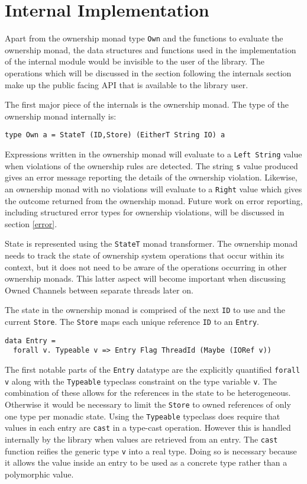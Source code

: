 \documentclass[onehalf,11pt]{beavtex}
\begin{document}
\section{Internal Implementation}

Apart from the ownership monad type \texttt{Own} and the functions to evaluate
the ownership monad, the data structures and functions used in the
implementation of the internal module would be invisible to the user of the
library.
The operations which will be discussed in the section following the internals
section make up the public facing API that is available to the library user.

The first major piece of the internals is the ownership monad.
The type of the ownership monad internally is:

\begin{verbatim}
type Own a = StateT (ID,Store) (EitherT String IO) a
\end{verbatim}

Expressions written in the ownership monad will evaluate to a
\texttt{Left String} value when violations of the ownership rules are detected.
The string \texttt{s} value produced gives an error message reporting the
details of the ownership violation.
Likewise, an ownership monad with no violations will evaluate to a
\texttt{Right} value which gives the outcome returned from the ownership monad.
Future work on error reporting, including structured error types for ownership
violations, will be discussed in section \ref{error}.

State is represented using the \texttt{StateT} monad transformer.
The ownership monad needs to track the state of ownership system operations that
occur within its context, but it does not need to be aware of the operations
occurring in other ownership monads.
This latter aspect will become important when discussing Owned Channels between
separate threads later on.

The state in the ownership monad is comprised of the next \texttt{ID}
to use and the current \texttt{Store}.  The \texttt{Store} maps each unique
reference \texttt{ID} to an \texttt{Entry}.

\begin{verbatim}
data Entry =
  forall v. Typeable v => Entry Flag ThreadId (Maybe (IORef v))
\end{verbatim}

The first notable parts of the \texttt{Entry} datatype are the explicitly
quantified \texttt{forall v} along with the \texttt{Typeable} typeclass
constraint on the type variable \texttt{v}.
The combination of these allows for the references in the state to be
heterogeneous.
Otherwise it would be necessary to limit the \texttt{Store} to owned
references of only one type per monadic state. %
Using the \texttt{Typeable} typeclass does require that values in each entry are
\texttt{cast} in a type-cast operation.  However this is handled internally
by the library when values are retrieved from an entry.
The \texttt{cast} function reifies the generic type \texttt{v} into a real
type.
Doing so is necessary because it allows the value inside an entry to be used
as a concrete type rather than a polymorphic value.
\end{document}
